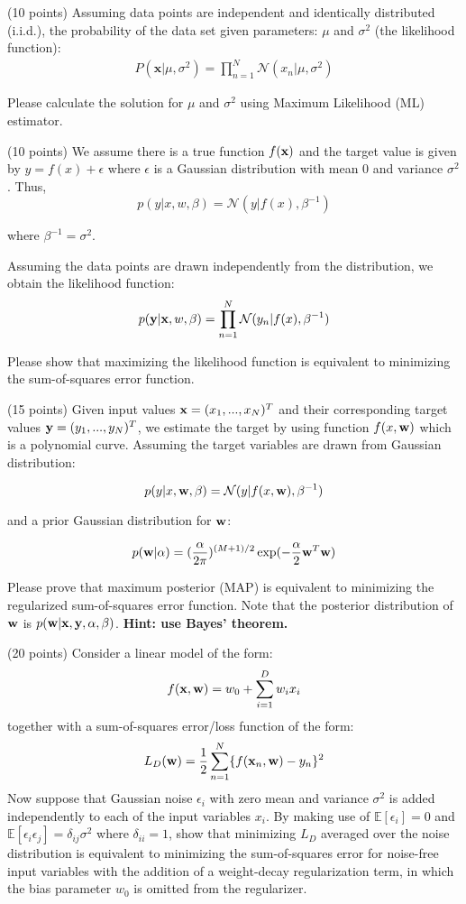 \documentclass{exam}
\newcommand{\xx}{{\bf{x}}}
\newcommand{\yy}{{\bf{y}}}
\newcommand{\ww}{{\bf{w}}}
\begin{document}
\begin{questions}

 (10 points) Assuming data points are independent and identically distributed (i.i.d.), the probability of the data set given parameters: $\mu$ and $\sigma^2$ (the likelihood function):
\begin{align}
\nonumber P(\mathbf{x}|\mu,\sigma^2) = \prod_{n=1}^N\mathcal{N}(x_n|\mu,\sigma^2)
\end{align}

Please calculate the solution for $\mu$ and $\sigma^2$ using Maximum Likelihood (ML) estimator.


\newpage
{} (10 points) We assume there is a true function $f(\xx)$ and the target value is given by $y=f(x)+\epsilon$ where $\epsilon$ is a Gaussian distribution with mean $0$ and variance $\sigma^2$.
Thus,
$$p(y|x,w,\beta) =\mathcal{N}(y| f(x), \beta^{-1})$$

where $\beta^{-1} = \sigma^2$.

Assuming the data points are drawn independently from the distribution, we obtain the likelihood function:
$$p(\mathbf{y}|\xx,w,\beta) = \prod_{n=1}^N \mathcal{N}(y_n|f(x),\beta^{-1})$$

Please show that maximizing the likelihood function is equivalent to minimizing the sum-of-squares error function.


\newpage
{} (15 points) Given input values $\xx= (x_1,...,x_N)^T$ and their corresponding target values $\yy= (y_1,...,y_N)^T$, we estimate the target by using function $f(x,\ww)$ which is a polynomial curve. Assuming the target variables are drawn from Gaussian distribution:

$$p(y|x, \ww,\beta) = \mathcal{N} (y | f(x,\ww), \beta^{-1})$$

and  a prior Gaussian distribution for $\ww$:

$$p(\ww|\alpha) = (\frac{\alpha}{2\pi})^{(M+1)/2} \exp(-\frac{\alpha}{2} \ww^T\ww)$$

Please prove that maximum posterior (MAP) is equivalent to minimizing the regularized sum-of-squares error function. Note that the posterior distribution of $\ww$ is $p(\ww|\xx,\yy,\alpha,\beta)$. \textbf{Hint: use Bayes' theorem.}



\newpage
{} (20 points) Consider a linear model of the form:
$$f(\xx,\ww) = w_0 + \sum_{i=1}^D w_i x_i$$
together with a sum-of-squares error/loss function of the form:
$$L_D(\ww) = \frac{1}{2} \sum_{n=1}^N \{f(\xx_n,\ww) - y_n\}^2$$
Now suppose that Gaussian noise $\epsilon_i$ with zero mean and variance $\sigma^2$ is added independently to each of the input variables $x_i$. By making use of $\mathbb{E}[\epsilon_i]=0$ and $\mathbb{E}[\epsilon_i\epsilon_j]=\delta_{ij} \sigma^2$ where $\delta_{ii}=1$, show that minimizing $L_D$ averaged over the noise distribution is equivalent to minimizing the sum-of-squares error
for noise-free input variables with the addition of a weight-decay regularization term, in which the bias parameter $w_0$ is omitted from the regularizer.


\end{questions}
\end{document}
